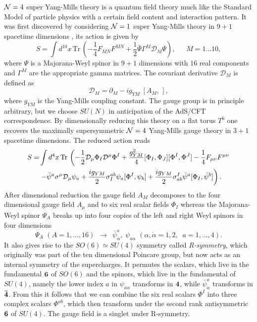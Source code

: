 $\mathcal{N}=4$ super Yang-Mills theory is a quantum field theory much like the Standard Model of particle physics with a certain field content and interaction pattern.
It was first discovered by considering $\mathcal{N}=1$ super Yang-Mills theory in $9+1$ spacetime dimensions \cite{Brink:1977}, its action is given by
\begin{equation}
	S = \int d^{10} x \, \mathrm{Tr} \, \left( -\frac{1}{4}  F_{MN} F^{MN}  + \frac{1}{2} \bar{\Psi} \Gamma^M \mathcal{D}_M \Psi \right), \; \quad \; M = 1 \dots 10,
\end{equation}
where $\Psi$ is a Majorana-Weyl spinor in $9+1$ dimensions with $16$ real components and $\Gamma^M$ are the appropriate gamma matrices. 
The covariant derivative $\mathcal{D}_M$ is defined as
\begin{equation}
	\mathcal{D}_M = \partial_M - ig_{YM} \; [A_M, \, ],
\end{equation}
where $g_{YM}$ is the Yang-Mills coupling constant. 
The gauge group is in principle arbitrary, but we choose $SU(N)$ in anticipation of the AdS/CFT correspondence. 
By dimensionally reducing this theory on a flat torus $T^6$ one recovers the maximally supersymmetric $\mathcal{N}=4$ Yang-Mills gauge theory in $3+1$ spacetime dimensions.
The reduced action reads
\begin{equation}
\begin{split}
S = & \int d^4 x \, \mathrm{Tr} \, \left( -\frac{1}{2} \mathcal{D}_\mu \Phi_I \mathcal{D}^\mu \Phi^I  + \frac{g_{YM}^2}{4} [\Phi_I, \Phi_J] [\Phi^I, \Phi^J] - \frac{1}{4}  F_{\mu\nu} F^{\mu\nu}  \right. \\
	 &\left. - \bar{\psi}^a \sigma^\mu \mathcal{D}_\mu \psi_a  + \frac{ig_{YM}}{2} \sigma^{ab}_I \psi_a [\Phi^I, \psi_b] + \frac{ig_{YM}}{2} \sigma_{ab}^I \bar{\psi}^a [\Phi_I, \bar{\psi}^b] \right).
\end{split}
\label{eq:n4_action}
\end{equation}
After dimensional reduction the gauge field $A_M$ decomposes to the four dimensional gauge field $A_\mu$ and to six real scalar fields $\Phi_I$ whereas the Majorana-Weyl spinor $\Psi_A$ breaks up into four copies of the left and right Weyl spinors in four dimensions 
\begin{equation}
	\Psi_A \, \, (A = 1, ..., 16) \, \, \, \rightarrow \, \, \,  \bar{\psi}^a_{\dot{\alpha}}, \; \psi_{a\alpha} \, \, (\alpha, \dot{\alpha} = 1, 2, \; \; a = 1, ..., 4).
\end{equation}
It also gives rise to the $SO(6) \simeq SU(4)$ symmetry called \emph{R-symmetry}, which originally was part of the ten dimensional Poincare group, but now acts as an internal symmetry of the supercharges.
It permutes the scalars, which live in the fundamental ${\bf 6}$ of $SO(6)$ and the spinors, which live in the fundamental of $SU(4)$, namely the lower index $a$ in $\psi_{a\alpha}$ transforms in ${\bf 4}$, while $\bar{\psi}_{\dot{\alpha}}^a$ transforms in ${\bf \bar{4}}$. 
From this it follows that we can combine the six real scalars $\Phi^I$ into three complex scalars $\Phi^{ab}$, which then transform under the second rank antisymmetric ${\bf 6}$ of $SU(4)$. 
The gauge field is a singlet under R-symmetry.

